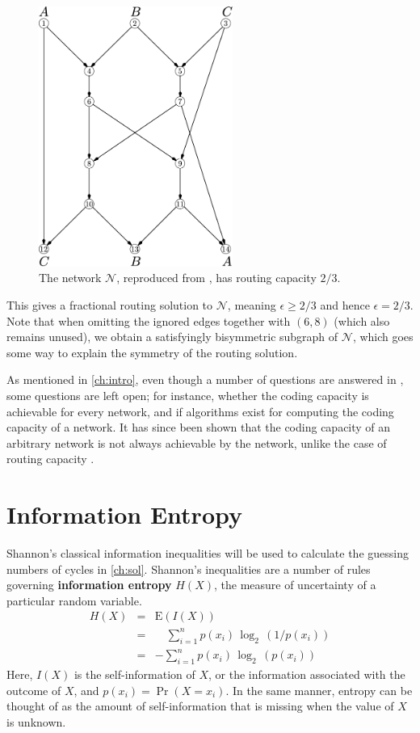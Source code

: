 \begin{figure}[ht]
	\centering
	\includegraphics[width=180pt]{figures/routing.pdf}
	\caption[Routing capacity of the network $\mathcal{N}$]{The network $\mathcal{N}$, reproduced from \cite{cann2006}, has routing capacity $2/3$.}
	\label{routing}
\end{figure}

This gives a fractional routing solution to $\mathcal{N}$, meaning $\epsilon \geq 2/3$ and hence $\epsilon = 2/3$. Note that when omitting the ignored edges together with $(6, 8)$ (which also remains unused), we obtain a satisfyingly bisymmetric subgraph of $\mathcal{N}$, which goes some way to explain the symmetry of the routing solution.

As mentioned in \autoref{ch:intro}, even though a number of questions are answered in \cite{cann2006}, some questions are left open; for instance, whether the coding capacity is achievable for every network, and if algorithms exist for computing the coding capacity of a network. It has since been shown that the coding capacity of an arbitrary network is not always achievable by the network, unlike the case of routing capacity \cite{doug2006}.

\section{Information Entropy}
\label{sect:entropy}

Shannon's classical information inequalities \cite{shan1948} will be used to calculate the guessing numbers of cycles in \autoref{ch:sol}. Shannon's inequalities are a number of rules governing \textbf{information entropy} $H(X)$, the measure of uncertainty of a particular random variable.
\begin{eqnarray*}
  	H(X) & = & \mathrm{E}(I(X)) \\
	       & = & \quad \sum_{i = 1}^n p(x_i) \, \log_2 \, ( 1 / p(x_i)) \\
	       & = & - \sum_{i = 1}^n p(x_i) \, \log_2 \, (p(x_i))
\end{eqnarray*}
Here, $I(X)$ is the self-information of $X$, or the information associated with the outcome of $X$, and $p(x_i) = \Pr(X \! = \! x_i)$. In the same manner, entropy can be thought of as the amount of self-information that is missing when the value of $X$ is unknown.

